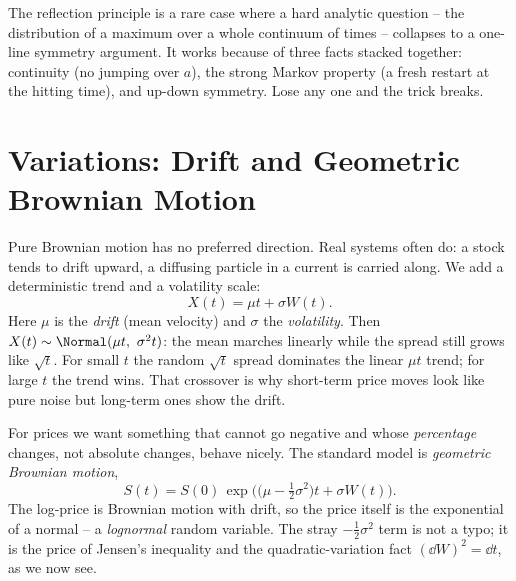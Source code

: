 \begin{aestheticbox}
The reflection principle is a rare case where a hard analytic question -- the
distribution of a maximum over a whole continuum of times -- collapses to a
one-line symmetry argument. It works because of three facts stacked together:
continuity (no jumping over $a$), the strong Markov property (a fresh restart at
the hitting time), and up-down symmetry. Lose any one and the trick breaks.
\end{aestheticbox}

\section{Variations: Drift and Geometric Brownian Motion}
\label{ch29:drift}

Pure Brownian motion has no preferred direction. Real systems often do: a stock
tends to drift upward, a diffusing particle in a current is carried along. We add
a deterministic trend and a volatility scale:
\[
  X(t) = \mu t + \sigma W(t).
\]
Here $\mu$ is the \emph{drift} (mean velocity) and $\sigma$ the \emph{volatility}.
Then $X(t)\sim\Normal(\mu t,\ \sigma^2 t)$: the mean marches linearly while the
spread still grows like $\sqrt t$. For small $t$ the random $\sqrt t$ spread
dominates the linear $\mu t$ trend; for large $t$ the trend wins. That crossover
is why short-term price moves look like pure noise but long-term ones show the
drift.

For prices we want something that cannot go negative and whose \emph{percentage}
changes, not absolute changes, behave nicely. The standard model is
\emph{geometric Brownian motion},
\[
  S(t) = S(0)\,\exp\!\Big(\big(\mu - \tfrac12\sigma^2\big)t + \sigma W(t)\Big).
\]
The log-price is Brownian motion with drift, so the price itself is the
exponential of a normal -- a \emph{lognormal} random variable. The stray
$-\tfrac12\sigma^2$ term is not a typo; it is the price of Jensen's inequality and
the quadratic-variation fact $(\dd W)^2=\dd t$, as we now see.

